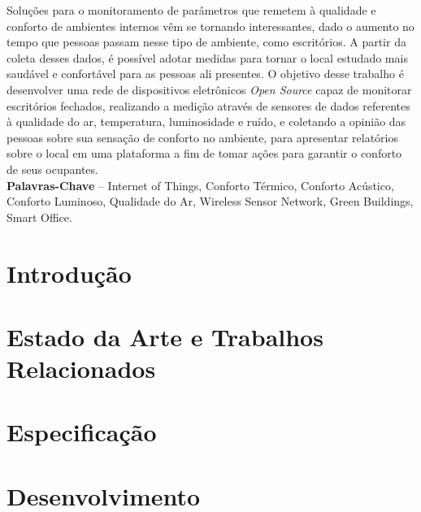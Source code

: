 \documentclass[]{politex}
\begin{document}
\capa
\folhaderosto


\begin{resumo}
Soluções para o monitoramento de parâmetros que remetem à qualidade e conforto de ambientes internos vêm se tornando interessantes, dado o aumento no tempo que pessoas passam nesse tipo de ambiente, como escritórios. A partir da coleta desses dados, é possível adotar medidas para tornar o local estudado mais saudável e confortável para as pessoas ali presentes. O objetivo desse trabalho é desenvolver uma rede de dispositivos eletrônicos \textit{Open Source} capaz de monitorar escritórios fechados, realizando a medição através de sensores de dados referentes à qualidade do ar, temperatura, luminosidade e ruído, e coletando a opinião das pessoas sobre sua sensação de conforto no ambiente, para apresentar relatórios sobre o local em uma plataforma a fim de tomar ações para garantir o conforto de seus ocupantes. 
%
\\[3\baselineskip]
%
\textbf{Palavras-Chave} -- Internet of Things, Conforto Térmico, Conforto Acústico, Conforto Luminoso, Qualidade do Ar, Wireless Sensor Network, Green Buildings, Smart Office.
\end{resumo}


\sumario


\chapter{Introdução}


\chapter{Estado da Arte e Trabalhos Relacionados} %


\chapter{Especificação}


\chapter{Desenvolvimento}


\appendix



%




\end{document}
